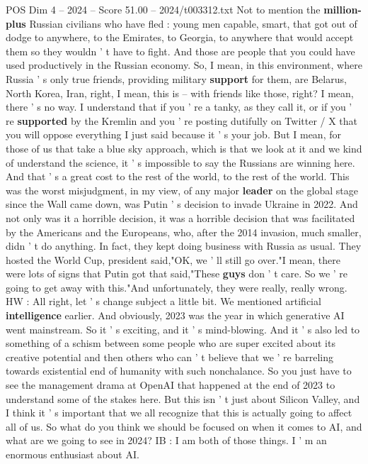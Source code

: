 \begin{textsample}{POS Dim 4 – 2024 – Score 51.00 – 2024/t003312.txt}
Not to mention the \textbf{million-plus} Russian civilians who have fled : young men capable, smart, that got out of dodge to anywhere, to the Emirates, to Georgia, to anywhere that would accept them so they wouldn ' t have to fight.
And those are people that you could have used productively in the Russian economy.
So, I mean, in this environment, where Russia ' s only true friends, providing military \textbf{support} for them, are Belarus, North Korea, Iran, right, I mean, this is -- with friends like those, right?
I mean, there ' s no way.
I understand that if you ' re a tanky, as they call it, or if you ' re \textbf{supported} by the Kremlin and you ' re posting dutifully on Twitter / X that you will oppose everything I just said because it ' s your job.
But I mean, for those of us that take a blue sky approach, which is that we look at it and we kind of understand the science, it ' s impossible to say the Russians are winning here.
And that ' s a great cost to the rest of the world, to the rest of the world.
This was the worst misjudgment, in my view, of any major \textbf{leader} on the global stage since the Wall came down, was Putin ' s decision to invade Ukraine in 2022.
And not only was it a horrible decision, it was a horrible decision that was facilitated by the Americans and the Europeans, who, after the 2014 invasion, much smaller, didn ' t do anything.
In fact, they kept doing business with Russia as usual.
They hosted the World Cup, president said,"OK, we ' ll still go over."I mean, there were lots of signs that Putin got that said,"These \textbf{guys} don ' t care.
So we ' re going to get away with this."And unfortunately, they were really, really wrong.
HW : All right, let ' s change subject a little bit.
We mentioned artificial \textbf{intelligence} earlier.
And obviously, 2023 was the year in which generative AI went mainstream.
So it ' s exciting, and it ' s mind-blowing.
And it ' s also led to something of a schism between some people who are super excited about its creative potential and then others who can ' t believe that we ' re barreling towards existential end of humanity with such nonchalance.
So you just have to see the management drama at OpenAI that happened at the end of 2023 to understand some of the stakes here.
But this isn ' t just about Silicon Valley, and I think it ' s important that we all recognize that this is actually going to affect all of us.
So what do you think we should be focused on when it comes to AI, and what are we going to see in 2024?
IB : I am both of those things.
I ' m an enormous enthusiast about AI.

\end{textsample}
